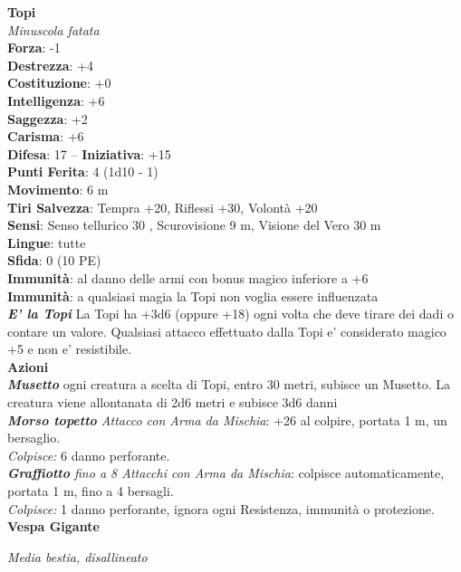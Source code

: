 \begin{multicols}{2}
\medskip\textbf{Topi}\\
\emph{Minuscola fatata}\\
\textbf{Forza}: -1\\
\textbf{Destrezza}: +4\\
\textbf{Costituzione}: +0\\
\textbf{Intelligenza}: +6\\
\textbf{Saggezza}: +2\\
\textbf{Carisma}: +6\\
\textbf{Difesa}: 17 -- \textbf{Iniziativa}: +15\\
\textbf{Punti Ferita}: 4 (1d10 - 1)\\
\textbf{Movimento}: 6 m\\
\textbf{Tiri Salvezza}: Tempra +20, Riflessi +30, Volontà +20 \\
\textbf{Sensi}: Senso tellurico 30 , Scurovisione 9 m, Visione del Vero 30 m\\
\textbf{Lingue}: tutte\\
\textbf{Sfida}: 0 (10 PE)\smallskip\\
\textbf{Immunità}: al danno delle armi con bonus magico inferiore a +6\\
\textbf{Immunità}: a qualsiasi magia la Topi non voglia essere influenzata\\
\emph{\textbf{E' la Topi}} La Topi ha +3d6 (oppure +18) ogni volta che deve tirare dei dadi o contare un valore.
Qualsiasi attacco effettuato dalla Topi e' considerato magico +5 e non e' resistibile.\\
\smallskip\textbf{Azioni}\\
\emph{\textbf{Musetto}} ogni creatura a scelta di Topi, entro 30 metri, subisce un Musetto. La creatura viene allontanata di 2d6 metri e subisce 3d6 danni\\
\emph{\textbf{Morso topetto} Attacco con Arma da Mischia}: +26 al colpire, portata 1 m, un bersaglio.\\
\emph{Colpisce:} 6 danno perforante.\\
\emph{\textbf{Graffiotto} fino a 8 Attacchi con Arma da Mischia}: colpisce automaticamente, portata 1 m, fino a 4 bersagli.\\
\emph{Colpisce:} 1 danno perforante, ignora ogni Resistenza, immunità o protezione.\\


\medskip\textbf{Vespa Gigante}

\emph{Media bestia, disallineato}


\end{multicols}

